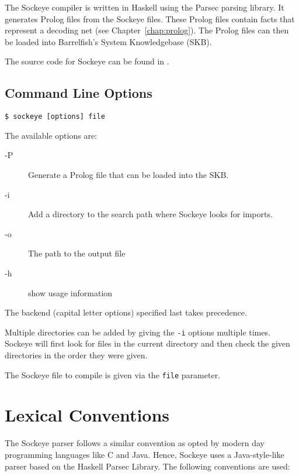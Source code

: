 \documentclass[a4paper,11pt,twoside]{report}
\begin{document}
{{{The Sockeye compiler is written in Haskell using the Parsec parsing library. It
generates Prolog files from the Sockeye files. These Prolog files contain facts that represent a decoding net (see Chapter~\ref{chap:prolog}).
The Prolog files can then be loaded into Barrelfish's System Knowledgebase (SKB).

The source code for Sockeye can be found in .


\section{Command Line Options}

\begin{verbatim}
$ sockeye [options] file
\end{verbatim}


The available options are:
\begin{description}
\item[-P] Generate a Prolog file that can be loaded into the SKB.
\item[-i] Add a directory to the search path where Sockeye looks for imports.
\item[-o]  The path to the output file
\item[-h] show usage information
\end{description}

The backend (capital letter options) specified last takes precedence.

Multiple directories can be added by giving the \texttt{-i} options multiple times.
Sockeye will first look for files in the current directory and then check the given directories in the order they were given.

The Sockeye file to compile is given via the \texttt{file} parameter.


\chapter{Lexical Conventions}
\label{chap:lexer}

The Sockeye parser follows a similar convention as opted by modern day 
programming languages like C and Java. Hence, Sockeye uses a Java-style-like
parser based on the Haskell Parsec Library. The following conventions are used:

}}}
\end{document}
